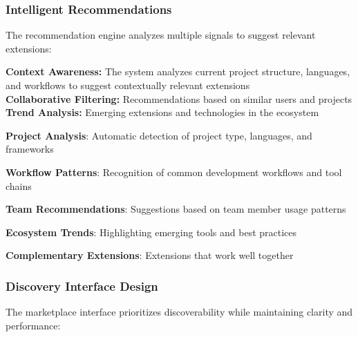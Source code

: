 \subsubsection{Intelligent Recommendations}
\label{subsubsec:intelligent-recommendations}

The recommendation engine analyzes multiple signals to suggest relevant extensions:

\begin{infobox}[title=AI-Powered Discovery]
\textbf{Context Awareness:} The system analyzes current project structure, languages, and workflows to suggest contextually relevant extensions \\
\textbf{Collaborative Filtering:} Recommendations based on similar users and projects \\
\textbf{Trend Analysis:} Emerging extensions and technologies in the ecosystem
\end{infobox}

\begin{compactlist}
\item \textbf{Project Analysis}: Automatic detection of project type, languages, and frameworks
\item \textbf{Workflow Patterns}: Recognition of common development workflows and tool chains
\item \textbf{Team Recommendations}: Suggestions based on team member usage patterns
\item \textbf{Ecosystem Trends}: Highlighting emerging tools and best practices
\item \textbf{Complementary Extensions}: Extensions that work well together
\end{compactlist}

\subsubsection{Discovery Interface Design}
\label{subsubsec:discovery-interface-design}

The marketplace interface prioritizes discoverability while maintaining clarity and performance:

